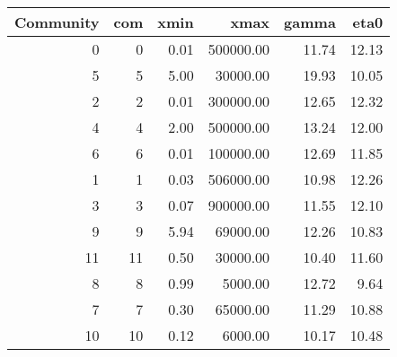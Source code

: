 \begin{tabular}{rrrrrr}
\toprule
 Community &  com &  xmin &      xmax &  gamma &  eta0 \\
\midrule
         0 &    0 &  0.01 & 500000.00 &  11.74 & 12.13 \\
         5 &    5 &  5.00 &  30000.00 &  19.93 & 10.05 \\
         2 &    2 &  0.01 & 300000.00 &  12.65 & 12.32 \\
         4 &    4 &  2.00 & 500000.00 &  13.24 & 12.00 \\
         6 &    6 &  0.01 & 100000.00 &  12.69 & 11.85 \\
         1 &    1 &  0.03 & 506000.00 &  10.98 & 12.26 \\
         3 &    3 &  0.07 & 900000.00 &  11.55 & 12.10 \\
         9 &    9 &  5.94 &  69000.00 &  12.26 & 10.83 \\
        11 &   11 &  0.50 &  30000.00 &  10.40 & 11.60 \\
         8 &    8 &  0.99 &   5000.00 &  12.72 &  9.64 \\
         7 &    7 &  0.30 &  65000.00 &  11.29 & 10.88 \\
        10 &   10 &  0.12 &   6000.00 &  10.17 & 10.48 \\
\bottomrule
\end{tabular}

